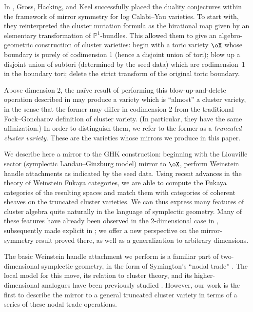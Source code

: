 \documentclass[10pt,a4paper]{amsart}
\numberwithin{equation}{section}
\def\PP{\mathbb{P}}
\begin{document}
In \cite{GHK2, GHK1}, Gross, Hacking, and Keel successfully placed the duality conjectures within the framework of mirror symmetry for log Calabi--Yau varieties. To start with, they reinterpreted the cluster mutation formula as the birational map given by an elementary transformation of $\PP^1$-bundles. This allowed them to give an algebro-geometric construction of cluster varieties: begin with a toric variety $\oX$ whose boundary is purely of codimension 1 (hence a disjoint union of tori); blow up a disjoint union of subtori (determined by the seed data) which are codimension~1 in the boundary tori; delete the strict transform of the original toric boundary.

Above dimension 2, the na\"ive result of performing this blow-up-and-delete operation described in \cite{GHK2} may produce a variety which is ``almost'' a cluster variety, in the sense that the former may differ in codimension 2 from the traditional Fock--Goncharov definition of cluster variety. (In particular, they have the same affinization.) In order to distinguish them, we refer to the former as a {\it truncated cluster variety}. These are the varieties whose mirrors we produce in this paper.

We describe here a mirror to the GHK construction: beginning with the Liouville sector (symplectic Landau--Ginzburg model) mirror to $\oX$, perform Weinstein handle attachments as indicated by the seed data. Using recent advances \cite{GPS2,GPS3,GPS1,NS20} in the theory of Weinstein Fukaya categories, we are able to compute the Fukaya categories of the resulting spaces and match them with categories of coherent sheaves on the truncated cluster varieties. We can thus express many features of cluster algebra quite naturally in the language of symplectic geometry. Many of these features have already been observed in the 2-dimensional case in \cite{STW,STWZ}, subsequently made explicit in \cite{HK20}; we offer a new perspective on the mirror-symmetry result proved there, as well as a generalization to arbitrary dimensions.

The basic Weinstein handle attachment we perform is a familiar part of two-dimensional symplectic geometry, in the form
of Symington's ``nodal trade'' \cite{Sym}. The local model for this move, its relation to cluster theory, and its higher-dimensional analogues have been previously studied \cite{Nad-mut,PT,Vianna}. However, our work is the first to describe the mirror to a general truncated cluster variety in terms of a series of these nodal trade operations.
\end{document}
